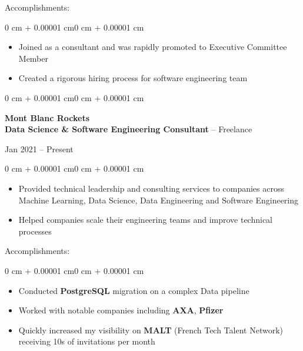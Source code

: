 \documentclass[10pt, letterpaper]{article}
\newenvironment{highlights}{
    \begin{itemize}[
        topsep=0.10 cm,
        parsep=0.10 cm,
        partopsep=0pt,
        itemsep=0pt,
        leftmargin=1.5 cm
    ]
}{
    \end{itemize}
}
\newenvironment{highlightsforbulletentries}{
    \begin{itemize}[
        topsep=0.10 cm,
        parsep=0.10 cm,
        partopsep=0pt,
        itemsep=0pt,
        leftmargin=1.5 cm
    ]
}{
    \end{itemize}
}
\newenvironment{onecolentry}{
    \begin{adjustwidth}{0 cm + 0.00001 cm}{0 cm + 0.00001 cm}
}{
    \end{adjustwidth}
}
\newenvironment{twocolentry}[2][]{
    \onecolentry
    \def\secondColumn{#2}
    \setcolumnwidth{\fill, 4.5 cm}
    \begin{paracol}{2}
}{
    \switchcolumn \raggedleft \secondColumn
    \end{paracol}
    \endonecolentry
}
\begin{document}
    Accomplishments:
    \begin{onecolentry}
        \begin{highlightsforbulletentries}
            \item Joined as a consultant and was rapidly promoted to Executive Committee Member
            \item Created a rigorous hiring process for software engineering team
        \end{highlightsforbulletentries}
    \end{onecolentry}

    \vspace{0.5cm}

    \begin{twocolentry}{Jan 2021 -- Present}
        \textbf{Mont Blanc Rockets} \\
        \textbf{Data Science \& Software Engineering Consultant} -- Freelance
    \end{twocolentry}
    \begin{onecolentry}
        \begin{highlights}
            \item Provided technical leadership and consulting services to companies across Machine Learning, Data Science, Data Engineering and Software Engineering
            \item Helped companies scale their engineering teams and improve technical processes
        \end{highlights}
    \end{onecolentry}

    Accomplishments:
    \begin{onecolentry}
        \begin{highlightsforbulletentries}
            \item Conducted \textbf{PostgreSQL} migration on a complex Data pipeline
            \item Worked with notable companies including \textbf{AXA}, \textbf{Pfizer}
            \item Quickly increased my visibility on \textbf{MALT} (French Tech Talent Network) receiving 10s of invitations per month
        \end{highlightsforbulletentries}
    \end{onecolentry}

    \vspace{0.5cm}
\end{document}
